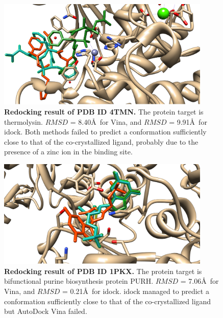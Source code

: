 \documentclass[10pt]{article}
\begin{document}
\begin{figure}[!ht]
\begin{center}
\includegraphics[width=4in]{Redocking4TMN.eps}
\end{center}
\caption{
{\bf Redocking result of PDB ID 4TMN.} The protein target is thermolysin. $RMSD$ = 8.40\AA\ for Vina, and $RMSD$ = 9.91\AA\ for idock. Both methods failed to predict a conformation sufficiently close to that of the co-crystallized ligand, probably due to the presence of a zinc ion in the binding site.
}
\label{Redocking4TMN}
\end{figure}

\begin{figure}[!ht]
\begin{center}
\includegraphics[width=4in]{Redocking1PKX.eps}
\end{center}
\caption{
{\bf Redocking result of PDB ID 1PKX.} The protein target is bifunctional purine biosynthesis protein PURH. $RMSD$ = 7.06\AA\ for Vina, and $RMSD$ = 0.21\AA\ for idock. idock managed to predict a conformation sufficiently close to that of the co-crystallized ligand but AutoDock Vina failed.
}
\label{Redocking1PKX}
\end{figure}
\end{document}
